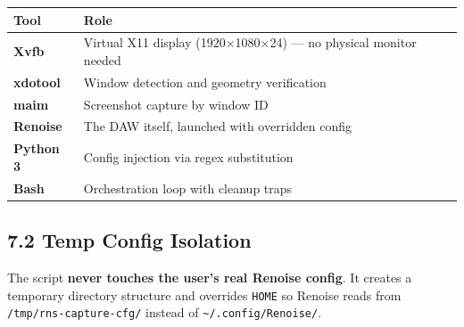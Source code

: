 \documentclass[
  11pt,
  oneside]{report}
\newenvironment{Shaded}{\begin{snugshade}}{\end{snugshade}}
\newcommand{\AttributeTok}[1]{\textcolor[rgb]{0.13,0.29,0.53}{#1}}
\newcommand{\CommentTok}[1]{\textcolor[rgb]{0.56,0.35,0.01}{\textit{#1}}}
\newcommand{\FunctionTok}[1]{\textcolor[rgb]{0.13,0.29,0.53}{\textbf{#1}}}
\newcommand{\NormalTok}[1]{#1}
\newcommand{\OperatorTok}[1]{\textcolor[rgb]{0.81,0.36,0.00}{\textbf{#1}}}
\newcommand{\PreprocessorTok}[1]{\textcolor[rgb]{0.56,0.35,0.01}{\textit{#1}}}
\newcommand{\StringTok}[1]{\textcolor[rgb]{0.31,0.60,0.02}{#1}}
\newcommand{\VariableTok}[1]{\textcolor[rgb]{0.00,0.00,0.00}{#1}}
\begin{document}
\begin{longtable}[]{@{}
  >{\raggedright\arraybackslash}p{}
  >{\raggedright\arraybackslash}p{}@{}}
\toprule\noalign{}
\begin{minipage}[b]{\linewidth}\raggedright
Tool
\end{minipage} & \begin{minipage}[b]{\linewidth}\raggedright
Role
\end{minipage} \\
\midrule\noalign{}
\endhead
\bottomrule\noalign{}
\endlastfoot
\textbf{Xvfb} & Virtual X11 display (1920×1080×24) --- no physical
monitor needed \\
\textbf{xdotool} & Window detection and geometry verification \\
\textbf{maim} & Screenshot capture by window ID \\
\textbf{Renoise} & The DAW itself, launched with overridden config \\
\textbf{Python 3} & Config injection via regex substitution \\
\textbf{Bash} & Orchestration loop with cleanup traps \\
\end{longtable}

\subsection{7.2 Temp Config Isolation}\label{temp-config-isolation}

The script \textbf{never touches the user's real Renoise config}. It
creates a temporary directory structure and overrides \texttt{HOME} so
Renoise reads from \texttt{/tmp/rns-capture-cfg/} instead of
\texttt{\textasciitilde{}/.config/Renoise/}.

\begin{Shaded}
\end{Shaded}
\end{document}
